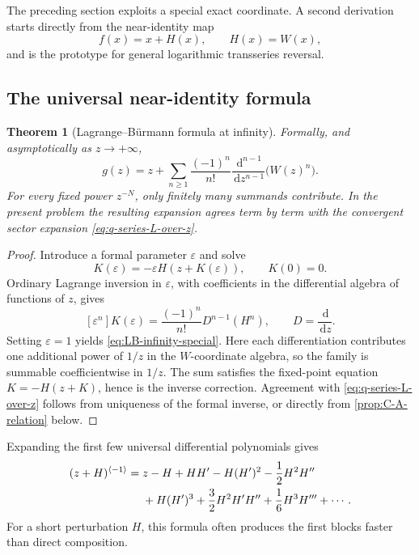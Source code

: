 \documentclass[11pt,a4paper]{article}
\numberwithin{equation}{section}
\newtheorem{theorem}{Theorem}[section]
\theoremstyle{definition}
\theoremstyle{remark}
\newcommand{\dd}{\,\mathrm d}
\begin{document}
The preceding section exploits a special exact coordinate.  A second
derivation starts directly from the near-identity map
\[
  f(x)=x+H(x),\qquad H(x)=W(x),
\]
and is the prototype for general logarithmic transseries reversal.

\subsection{The universal near-identity formula}

\begin{theorem}[Lagrange--B\"urmann formula at infinity]\label{thm:LB-infinity-special}
Formally, and asymptotically as \(z\to+\infty\),
\begin{equation}\label{eq:LB-infinity-special}
  g(z)=z+\sum_{n\ge1}\frac{(-1)^n}{n!}
  \frac{\dd^{n-1}}{\dd z^{n-1}}\bigl(W(z)^n\bigr).
\end{equation}
For every fixed power \(z^{-N}\), only finitely many summands contribute.
In the present problem the resulting expansion agrees term by term with the
convergent sector expansion \eqref{eq:q-series-L-over-z}.
\end{theorem}

\begin{proof}
Introduce a formal parameter \(\varepsilon\) and solve
\[
  K(\varepsilon)=-\varepsilon H(z+K(\varepsilon)),
  \qquad K(0)=0.
\]
Ordinary Lagrange inversion in \(\varepsilon\), with coefficients in the
differential algebra of functions of \(z\), gives
\[
  [\varepsilon^n]K(\varepsilon)
  =\frac{(-1)^n}{n!}D^{n-1}(H^n),
  \qquad D=\frac{\dd}{\dd z}.
\]
Setting \(\varepsilon=1\) yields \eqref{eq:LB-infinity-special}.  Here each
differentiation contributes one additional power of \(1/z\) in the
\(W\)-coordinate algebra, so the family is summable coefficientwise in
\(1/z\).  The sum satisfies the fixed-point equation
\(K=-H(z+K)\), hence is the inverse correction.  Agreement with
\eqref{eq:q-series-L-over-z} follows from uniqueness of the formal inverse,
or directly from \cref{prop:C-A-relation} below.
\end{proof}

Expanding the first few universal differential polynomials gives
\begin{align}
 (z+H)^{\langle-1\rangle}={}&z-H+HH'
 -H(H')^2-\frac12H^2H''
 \notag\\
 &+H(H')^3+\frac32H^2H'H''+\frac16H^3H'''
 +\cdots.
 \label{eq:universal-differential}
\end{align}
For a short perturbation \(H\), this formula often produces the first
blocks faster than direct composition.
\end{document}
